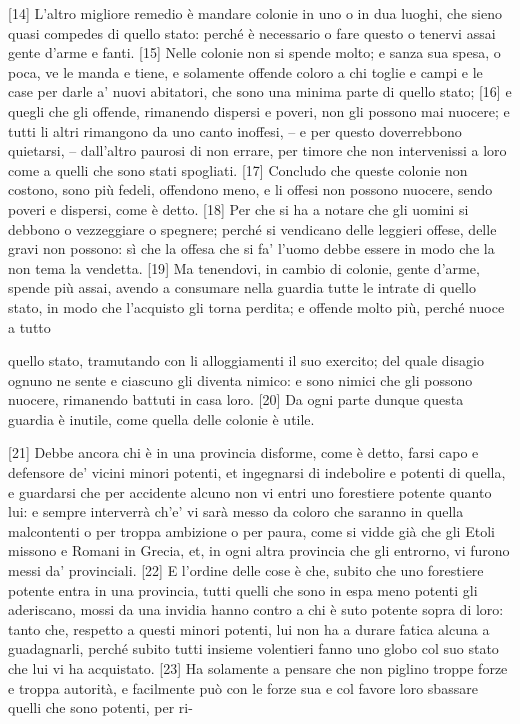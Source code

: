 {[}14{]} L'altro migliore remedio è mandare colonie in uno o in dua
luoghi, che sieno quasi compedes di quello stato: perché è necessario o
fare questo o tenervi assai gente d'arme e fanti. {[}15{]} Nelle colonie
non si spende molto; e sanza sua spesa, o poca, ve le manda e tiene, e
solamente offende coloro a chi toglie e campi e le case per darle a'
nuovi abitatori, che sono una minima parte di quello stato; {[}16{]} e
quegli che gli offende, rimanendo dispersi e poveri, non gli possono mai
nuocere; e tutti li altri rimangono da uno canto inoffesi, -- e per
questo doverrebbono quietarsi, -- dall'altro paurosi di non errare, per
timore che non intervenissi a loro come a quelli che sono stati
spogliati. {[}17{]} Concludo che queste colonie non costono, sono più
fedeli, offendono meno, e li offesi non possono nuocere, sendo poveri e
dispersi, come è detto. {[}18{]} Per che si ha a notare che gli uomini
si debbono o vezzeggiare o spegnere; perché si vendicano delle leggieri
offese, delle gravi non possono: sì che la offesa che si fa' l'uomo
debbe essere in modo che la non tema la vendetta. {[}19{]} Ma tenendovi,
in cambio di colonie, gente d'arme, spende più assai, avendo a consumare
nella guardia tutte le intrate di quello stato, in modo che l'acquisto
gli torna perdita; e offende molto più, perché nuoce a tutto \linebreak

\quebra

\noindent{}quello
stato, tramutando con li alloggiamenti il suo exercito; del quale
disagio ognuno ne sente e ciascuno gli diventa nimico: e sono nimici che
gli possono nuocere, rimanendo battuti in casa loro. {[}20{]} Da ogni
parte dunque questa guardia è inutile, come quella delle colonie è
utile.

{[}21{]} Debbe ancora chi è in una provincia disforme, come è detto,
farsi capo e defensore de' vicini minori potenti, et ingegnarsi di
indebolire e potenti di quella, e guardarsi che per accidente alcuno non
vi entri uno forestiere potente quanto lui: e sempre interverrà ch'e' vi
sarà messo da coloro che saranno in quella malcontenti o per troppa
ambizione o per paura, come si vidde già che gli Etoli missono e Romani
in Grecia, et, in ogni altra provincia che gli entrorno, vi furono messi
da' provinciali. {[}22{]} E l'ordine delle cose è che, subito che uno
forestiere potente entra in una provincia, tutti quelli che sono in espa
meno potenti gli aderiscano, mossi da una invidia hanno contro a chi è
suto potente sopra di loro: tanto che, respetto a questi minori potenti,
lui non ha a durare fatica alcuna a guadagnarli, perché subito tutti
insieme volentieri fanno uno globo col suo stato che lui vi ha
acquistato. {[}23{]} Ha solamente a pensare che non piglino troppe forze
e troppa autorità, e facilmente può con le forze sua e col favore loro
sbassare quelli che sono potenti, per ri-

